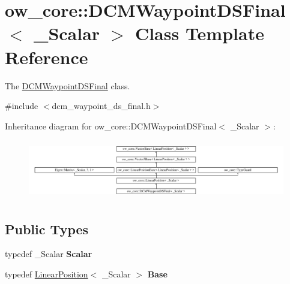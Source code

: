 \hypertarget{classow__core_1_1DCMWaypointDSFinal}{}\section{ow\+\_\+core\+:\+:D\+C\+M\+Waypoint\+D\+S\+Final$<$ \+\_\+\+Scalar $>$ Class Template Reference}
\label{classow__core_1_1DCMWaypointDSFinal}


The \hyperlink{classow__core_1_1DCMWaypointDSFinal}{D\+C\+M\+Waypoint\+D\+S\+Final} class.  




{\ttfamily \#include $<$dcm\+\_\+waypoint\+\_\+ds\+\_\+final.\+h$>$}

Inheritance diagram for ow\+\_\+core\+:\+:D\+C\+M\+Waypoint\+D\+S\+Final$<$ \+\_\+\+Scalar $>$\+:\begin{figure}[H]
\begin{center}
\leavevmode
\includegraphics[height=2.629108cm]{db/d08/classow__core_1_1DCMWaypointDSFinal}
\end{center}
\end{figure}
\subsection*{Public Types}
\begin{DoxyCompactItemize}
\item 
typedef \+\_\+\+Scalar {\bfseries Scalar}\hypertarget{classow__core_1_1DCMWaypointDSFinal_a505b8e6523e3323a856649e6f3b0047c}{}\label{classow__core_1_1DCMWaypointDSFinal_a505b8e6523e3323a856649e6f3b0047c}

\item 
typedef \hyperlink{classow__core_1_1LinearPosition}{Linear\+Position}$<$ \+\_\+\+Scalar $>$ {\bfseries Base}\hypertarget{classow__core_1_1DCMWaypointDSFinal_a9b341fe7a2565a2bfd99895d01e29cda}{}\label{classow__core_1_1DCMWaypointDSFinal_a9b341fe7a2565a2bfd99895d01e29cda}

\end{DoxyCompactItemize}
